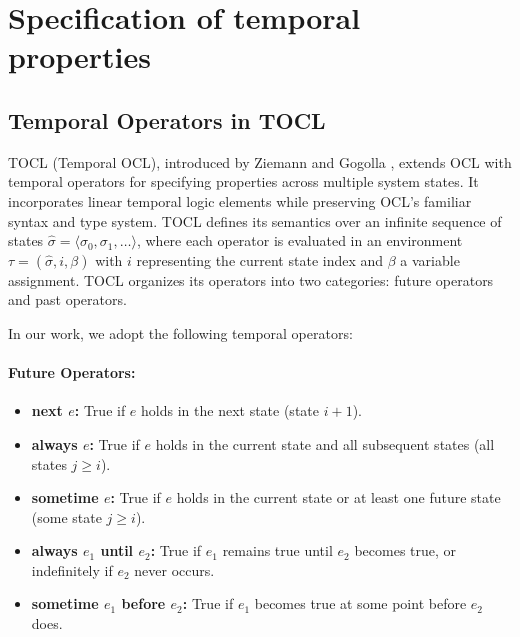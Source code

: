 \section{Specification of temporal properties}

\subsection{Temporal Operators in TOCL}

\hspace{1cm} TOCL (Temporal OCL), introduced by Ziemann and Gogolla \cite{TOCL}, 
extends OCL with temporal operators for specifying properties across multiple system 
states. It incorporates linear temporal logic elements while preserving OCL's familiar 
syntax and type system. TOCL defines its semantics over an infinite sequence of states 
$\hat{\sigma} = \langle \sigma_0, \sigma_1, \ldots \rangle$, where each operator is 
evaluated in an environment $\tau = (\hat{\sigma}, i, \beta)$ with $i$ representing 
the current state index and $\beta$ a variable assignment. TOCL organizes its operators 
into two categories: future operators and past operators.

In our work, we adopt the following temporal operators:

\paragraph{Future Operators:} 
\begin{itemize} 
    \item \textbf{next $e$:} True if $e$ holds in the next state (state $i+1$). 
    \item \textbf{always $e$:} True if $e$ holds in the current state and all subsequent states (all states $j \geq i$). 
    \item \textbf{sometime $e$:} True if $e$ holds in the current state or at least one future state (some state $j \geq i$). 
    \item \textbf{always $e_1$ until $e_2$:} True if $e_1$ remains true until $e_2$ becomes true, or indefinitely if $e_2$ never occurs. 
    \item \textbf{sometime $e_1$ before $e_2$:} True if $e_1$ becomes true at some point before $e_2$ does. 
\end{itemize}

